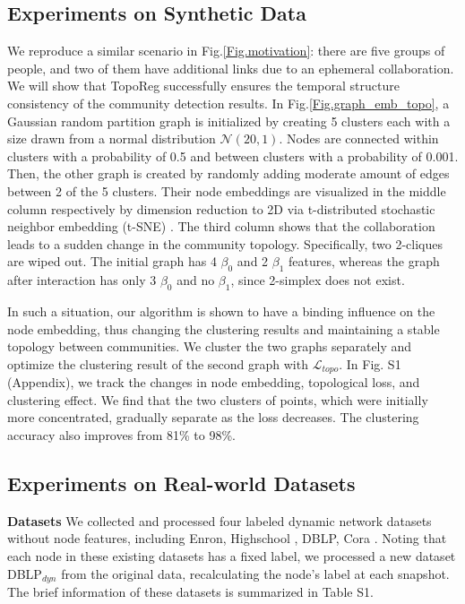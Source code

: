 \documentclass[letterpaper]{article} %
\begin{document}
\subsection{Experiments on Synthetic Data}
We reproduce a similar scenario in Fig.\ref{Fig.motivation}: there are five groups of people, and two of them have additional links due to an ephemeral collaboration. We will show that TopoReg successfully ensures the temporal structure consistency of the community detection results. In Fig.\ref{Fig.graph_emb_topo}, a Gaussian random partition graph is initialized by creating 5 clusters each with a size drawn from a normal distribution $\mathcal N(20,1)$. Nodes are connected within clusters with a probability of 0.5 and between clusters with a probability of 0.001. Then, the other graph is created by randomly adding moderate amount of edges between 2 of the 5 clusters. Their node embeddings are visualized in the middle column respectively by dimension reduction to 2D via t-distributed stochastic neighbor embedding (t-SNE) \cite{van2008visualizing}. The third column shows that the collaboration leads to a sudden change in the community topology. Specifically, two 2-cliques are wiped out. The initial graph has 4 $\beta_0$ and 2 $\beta_1$ features, whereas the graph after interaction has only 3 $\beta_0$  and no $\beta_1$, since 2-simplex does not exist. 

In such a situation, our algorithm is shown to have a binding influence on the node embedding, thus changing the clustering results and maintaining a stable topology between communities. We cluster the two graphs separately and optimize the clustering result of the second graph with $\mathcal{L}_{topo}$. In Fig. S1 (Appendix), we track the changes in node embedding, topological loss, and clustering effect. We find that the two clusters of points, which were initially more concentrated, gradually separate as the loss decreases. The clustering accuracy also improves from 81\% to 98\%.

\subsection{Experiments on Real-world Datasets}
\noindent\textbf{Datasets} We collected and processed four labeled dynamic network datasets without node features, including Enron, Highschool \cite{crawford2018cluenet}, DBLP, Cora \cite{hou2020glodyne}.  Noting that each node in these existing datasets has a fixed label, we processed a new dataset DBLP$_{dyn}$ from the original data, recalculating the node's label at each snapshot. The brief information of these datasets is summarized in Table S1. 
\end{document}

